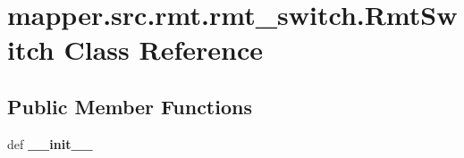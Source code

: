 \hypertarget{classmapper_1_1src_1_1rmt_1_1rmt__switch_1_1_rmt_switch}{}\section{mapper.\+src.\+rmt.\+rmt\+\_\+switch.\+Rmt\+Switch Class Reference}
\label{classmapper_1_1src_1_1rmt_1_1rmt__switch_1_1_rmt_switch}
\subsection*{Public Member Functions}
\begin{DoxyCompactItemize}
\item 
\hypertarget{classmapper_1_1src_1_1rmt_1_1rmt__switch_1_1_rmt_switch_ad44151aad9cfa4214085c9461f18a4a9}{}def {\bfseries \+\_\+\+\_\+init\+\_\+\+\_\+}\label{classmapper_1_1src_1_1rmt_1_1rmt__switch_1_1_rmt_switch_ad44151aad9cfa4214085c9461f18a4a9}

\end{DoxyCompactItemize}
